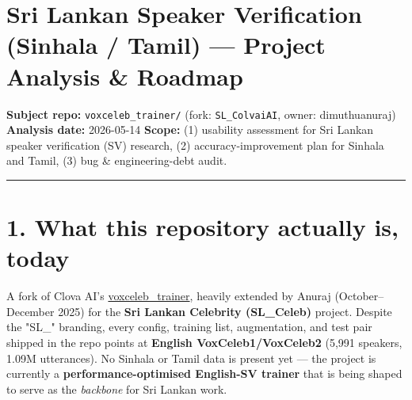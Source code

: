 \documentclass[10pt,a4paper]{article}
\title{}
\author{}
\date{}
\begin{document}
\section*{Sri Lankan Speaker Verification (Sinhala / Tamil) --- Project Analysis \& Roadmap}

\textbf{Subject repo:} \texttt{voxceleb\_trainer/} (fork: \texttt{SL\_ColvaiAI}, owner: dimuthuanuraj) \textbf{Analysis date:} 2026-05-14 \textbf{Scope:} (1) usability assessment for Sri Lankan speaker verification (SV) research, (2) accuracy-improvement plan for Sinhala and Tamil, (3) bug \& engineering-debt audit.

\vspace{0.5em}\hrule\vspace{0.5em}

\section*{1. What this repository actually is, today}

A fork of Clova AI's \href{https://github.com/clovaai/voxceleb_trainer}{voxceleb\_trainer}, heavily extended by Anuraj (October--December 2025) for the \textbf{Sri Lankan Celebrity (SL\_Celeb)} project. Despite the "SL\_" branding, every config, training list, augmentation, and test pair shipped in the repo points at \textbf{English VoxCeleb1/VoxCeleb2} (5,991 speakers, 1.09M utterances). No Sinhala or Tamil data is present yet --- the project is currently a \textbf{performance-optimised English-SV trainer} that is being shaped to serve as the \textit{backbone} for Sri Lankan work.
\end{document}
